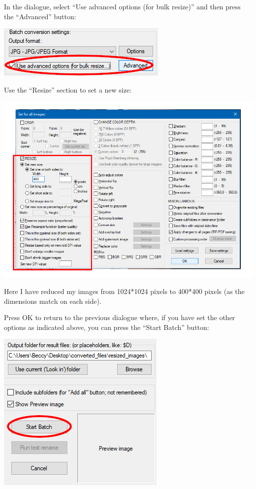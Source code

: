 \documentclass[]{book}
\begin{document}
In the dialogue, select ``Use advanced options (for bulk resize)'' and
then press the ``Advanced'' button:

\includegraphics{images/screenshots/irfanview_8.png}

Use the ``Resize'' section to set a new size:

\includegraphics{images/screenshots/irfanview_9.png}

Here I have reduced my images from 1024*1024 pixels to 400*400 pixels
(as the dimensions match on each side).

Press OK to return to the previous dialogue where, if you have set the
other options as indicated above, you can press the ``Start Batch''
button:

\includegraphics{images/screenshots/irfanview_10.png}
\end{document}
